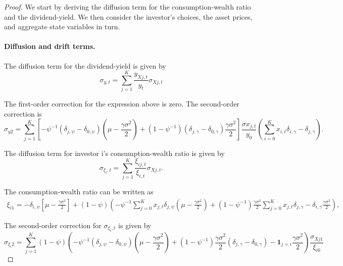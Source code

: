 \documentclass[11pt,english]{article}
\begin{document}
\begin{proof}

We start by deriving the diffusion term for the consumption-wealth ratio and the dividend-yield. We then consider the investor's choices, the asset prices, and aggregate state variables in turn.

\paragraph{Diffusion and drift terms.} The diffusion term for the dividend-yield is given by
\begin{equation}
    \sigma_{y,t} = \sum_{j=1}^K \frac{y_{Xj,t}}{y_t} \sigma_{Xj,t}
\end{equation}

The first-order correction for the expression above is zero. The second-order correction is
\begin{equation}
    \sigma_{y2} = \sum_{j=1}^K\left[- \psi^{-1}(\delta_{j,\psi}-\delta_{0,\psi}) \left( \mu - \frac{\gamma \sigma^2}{2} \right) + (1- \psi^{-1}) ( \delta_{j,\gamma}- \delta_{0,\gamma}) \frac{\gamma \sigma^2}{2} \right] \frac{\sigma x_{j,t} }{y_0}\left( \sum_{i=0}^K x_{i,t} \delta_{i,\gamma} - \delta_{j,\gamma} \right).
\end{equation}

The diffusion term for investor i's consumption-wealth ratio is given by
\begin{equation}
    \sigma_{\xi_i,t} = \sum_{j=1}^K \frac{\xi_{ij,t}}{\xi_{i,t}} \sigma_{Xj,t}.
\end{equation}

The consumption-wealth ratio can be written as
\begin{align*}
    \xi_{i1} = -\delta_{i,\psi} \left[\mu - \frac{\gamma\sigma^2}{2} \right]+(1-\psi) \left( -\psi^{-1} \sum_{j=0}^K x_{j,t} \delta_{j,\psi}  \left(\mu -\frac{\gamma \sigma^2}{2}\right) + (1-\psi^{-1}) \frac{ \gamma \sigma^2 }{2} \sum_{j=0}^K x_{j,t} \delta_{j,\gamma}   - \delta_{i,\gamma} \frac{\gamma\sigma^2}{2} \right),
\end{align*}

The second-order correction for $\sigma_{\xi_i,t}$ is given by
\begin{equation*}
    \sigma_{\xi_i2} = \sum_{j=1}^K (1-\psi) \left( -\psi^{-1} (\delta_{j,\psi}-\delta_{0,\psi})  \left(\mu -\frac{\gamma \sigma^2}{2}\right) + (1-\psi^{-1}) \frac{ \gamma \sigma^2 }{2} ( \delta_{j,\gamma}- \delta_{0,\gamma})   - \mathbf{1}_{j=i} \frac{\gamma\sigma^2}{2} \right) \frac{\sigma_{Xj1}}{\xi_{i0}}
\end{equation*}


\end{proof}
\end{document}
